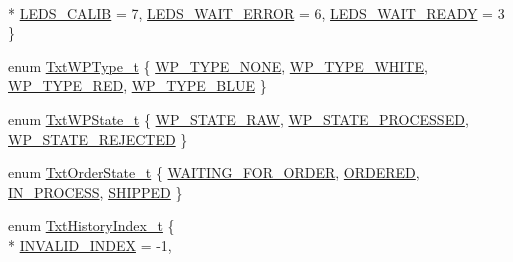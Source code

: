 \begin{DoxyCompactItemize}
\\*
\hyperlink{namespaceft_a14147563037506fac6464a9f6bcbad40a158802b2258d2facefc53322694d075b}{L\+E\+D\+S\+\_\+\+C\+A\+L\+IB} = 7, 
\hyperlink{namespaceft_a14147563037506fac6464a9f6bcbad40a3d7418ed867f8e8e31487ab3b0722a23}{L\+E\+D\+S\+\_\+\+W\+A\+I\+T\+\_\+\+E\+R\+R\+OR} = 6, 
\hyperlink{namespaceft_a14147563037506fac6464a9f6bcbad40a42860e5820e30d83771560a8ca25b83c}{L\+E\+D\+S\+\_\+\+W\+A\+I\+T\+\_\+\+R\+E\+A\+DY} = 3
 \}
\item 
enum \hyperlink{namespaceft_a2d5bf01b2da29de3c061682f3195b5b2}{Txt\+W\+P\+Type\+\_\+t} \{ \hyperlink{namespaceft_a2d5bf01b2da29de3c061682f3195b5b2ab91d3d82912b4deaf6b05246de9f6c4f}{W\+P\+\_\+\+T\+Y\+P\+E\+\_\+\+N\+O\+NE}, 
\hyperlink{namespaceft_a2d5bf01b2da29de3c061682f3195b5b2a521d02a75d01c4aab24174925e4f6d77}{W\+P\+\_\+\+T\+Y\+P\+E\+\_\+\+W\+H\+I\+TE}, 
\hyperlink{namespaceft_a2d5bf01b2da29de3c061682f3195b5b2aebed2c9f00b5fe0e9fa340d4606c0069}{W\+P\+\_\+\+T\+Y\+P\+E\+\_\+\+R\+ED}, 
\hyperlink{namespaceft_a2d5bf01b2da29de3c061682f3195b5b2a58a7065160333f32c49c5a27db0049ed}{W\+P\+\_\+\+T\+Y\+P\+E\+\_\+\+B\+L\+UE}
 \}
\item 
enum \hyperlink{namespaceft_ac089be1d932165fc32bd3838c892bce9}{Txt\+W\+P\+State\+\_\+t} \{ \hyperlink{namespaceft_ac089be1d932165fc32bd3838c892bce9a89cf3cb0d7dc7a7d7ddb9218608db4bc}{W\+P\+\_\+\+S\+T\+A\+T\+E\+\_\+\+R\+AW}, 
\hyperlink{namespaceft_ac089be1d932165fc32bd3838c892bce9ae9eb93be618e126327172e0bad8000bb}{W\+P\+\_\+\+S\+T\+A\+T\+E\+\_\+\+P\+R\+O\+C\+E\+S\+S\+ED}, 
\hyperlink{namespaceft_ac089be1d932165fc32bd3838c892bce9aeac6df77a61188f1b345690fde60f835}{W\+P\+\_\+\+S\+T\+A\+T\+E\+\_\+\+R\+E\+J\+E\+C\+T\+ED}
 \}
\item 
enum \hyperlink{namespaceft_a0b621af47c2875bbecb5f4a3d4218a5c}{Txt\+Order\+State\+\_\+t} \{ \hyperlink{namespaceft_a0b621af47c2875bbecb5f4a3d4218a5ca0fd16b9eb3abf82c6710ffcdea5331e0}{W\+A\+I\+T\+I\+N\+G\+\_\+\+F\+O\+R\+\_\+\+O\+R\+D\+ER}, 
\hyperlink{namespaceft_a0b621af47c2875bbecb5f4a3d4218a5ca54c2d88e3952e738ab65fa3fe8403f05}{O\+R\+D\+E\+R\+ED}, 
\hyperlink{namespaceft_a0b621af47c2875bbecb5f4a3d4218a5cace2b71d7eb6f92ac57dc8ef4a2d8212b}{I\+N\+\_\+\+P\+R\+O\+C\+E\+SS}, 
\hyperlink{namespaceft_a0b621af47c2875bbecb5f4a3d4218a5caf998b8ca10961018438b908be3d69bb4}{S\+H\+I\+P\+P\+ED}
 \}
\item 
enum \hyperlink{namespaceft_a87eb4112317a6f3c7ade8f26b6f8c1c8}{Txt\+History\+Index\+\_\+t} \{ \\*
\hyperlink{namespaceft_a87eb4112317a6f3c7ade8f26b6f8c1c8ad1157145341753371f54e8311c8c6bee}{I\+N\+V\+A\+L\+I\+D\+\_\+\+I\+N\+D\+EX} = -\/1, 

\end{DoxyCompactItemize}
